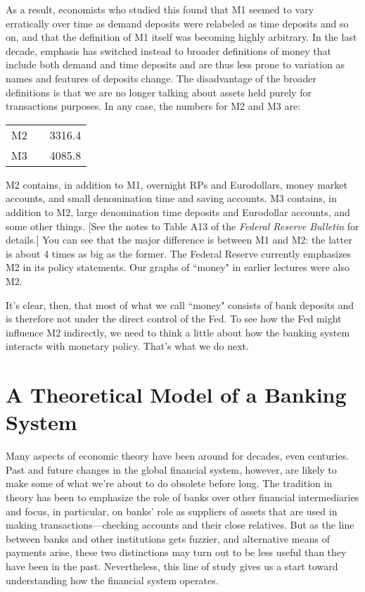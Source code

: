 \documentclass[letterpaper,12pt]{article}
\begin{document}
     As a result, economists who studied this found that M1 seemed to vary
erratically over time as demand deposits were relabeled as time deposits and so on, and that the
definition of M1 itself was becoming highly arbitrary. In the last decade, emphasis has switched
instead to broader definitions of money that include both demand and time deposits and are thus
less prone to variation as names and features of deposits change.  The disadvantage of the broader
definitions is that we are no longer talking about assets held purely for transactions purposes.
In any case, the numbers for M2 and M3 are:
%
\begin{center}
\begin{tabular}{lcr}
                              M2      & &    3316.4   \\
                              M3      & &    4085.8   \\
\end{tabular}
\end{center}
%
M2 contains, in addition to M1, overnight RPs and Eurodollars, money market accounts, and small
denomination time and saving accounts.  M3 contains, in addition to M2, large denomination time
deposits and Eurodollar accounts, and some other things.  [See the notes to Table A13 of the {\em
Federal Reserve Bulletin} for details.]  You can see that the major difference is between M1 and
M2:  the latter is about 4 times as big as the former.  The Federal Reserve currently emphasizes
M2 in its policy statements.  Our graphs of ``money" in earlier lectures were also M2.

     It's clear, then, that most of what we call ``money" consists of bank
deposits and is therefore not under the direct control of the Fed.  To see how the Fed might
influence M2 indirectly, we need to think a little about how the banking system interacts with
monetary policy.  That's what we do next.


\section{A Theoretical Model of a Banking System}

     Many aspects of economic theory have been around for decades, even
centuries.  Past and future changes in the global financial system, however, are likely to make
some of what we're about to do obsolete before long.  The tradition in theory has been to
emphasize the role of banks over other financial intermediaries and focus, in particular, on
banks' role as suppliers of assets that are used in making transactions---checking accounts and
their close relatives.  But as the line between banks and other institutions gets fuzzier, and
alternative means of payments arise, these two distinctions may turn out to be less useful than
they have been in the past. Nevertheless, this line of study gives us a start toward understanding
how the financial system operates.
\end{document}
